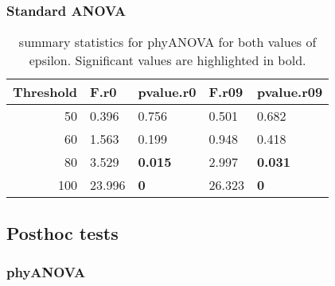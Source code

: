 \documentclass[]{article}
\begin{document}
\hypertarget{standard-anova-4}{%
\subsubsection{Standard ANOVA}\label{standard-anova-4}}

\begin{table}[H]

\caption{\label{tab:unnamed-chunk-30}summary statistics for phyANOVA for both values of epsilon. Significant values are highlighted in bold.}
\centering
\begin{tabular}{r|l|l|l|l}
\hline
Threshold & F.r0 & pvalue.r0 & F.r09 & pvalue.r09\\
\hline
50 & 0.396 & 0.756 & 0.501 & 0.682\\
\hline
60 & 1.563 & 0.199 & 0.948 & 0.418\\
\hline
80 & 3.529 & \textbf{0.015} & 2.997 & \textbf{0.031}\\
\hline
100 & 23.996 & \textbf{0} & 26.323 & \textbf{0}\\
\hline
\end{tabular}
\end{table}

\hypertarget{posthoc-tests-2}{%
\subsection{Posthoc tests}\label{posthoc-tests-2}}

\hypertarget{phyanova-5}{%
\subsubsection{phyANOVA}\label{phyanova-5}}
\end{document}
